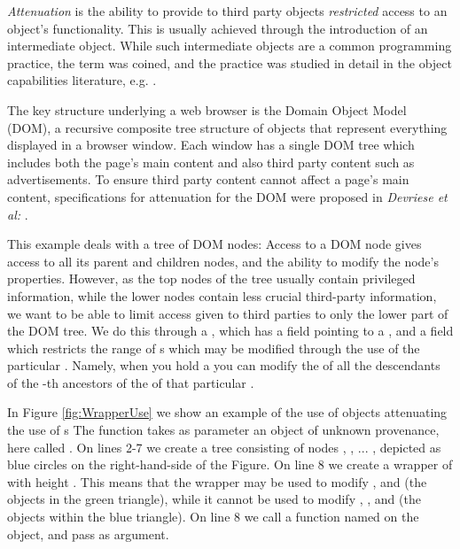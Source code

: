 \emph{Attenuation} is the ability to provide to third party objects \emph{restricted}  access to an object's functionality. This is usually achieved through the introduction of an intermediate object. While such intermediate objects are a common programming practice, 
the term was coined, and the practice  was studied in detail in the object capabilities literature,
e.g.  \cite{MillerPhD}. 

The key structure underlying a web browser is the Domain Object Model
(DOM), a recursive composite tree structure of objects that represent
everything displayed in a browser window.  Each window has a single DOM
tree which includes both the page's main content and also third party
content such as advertisements. To ensure third party content cannot
affect a page's main content,
specifications for attenuation for the DOM were proposed in
\textit{Devriese et al:}   \cite{dd}. 

This example deals with a tree of DOM nodes: Access to a DOM node
gives access to all its parent and children nodes, and the ability to
modify the node's properties. However, as the top nodes of the tree
usually contain privileged information, while the lower nodes contain
less crucial third-party information, we want to be able to limit  access given to third parties to only the lower part of the DOM tree. We do this through a , which has a field  pointing to a , and a field  which restricts the range of s which may be modified through the use of the particular . Namely, when you hold a   you can modify the  of all the descendants of the    -th ancestors of the  of that particular . %


In Figure \ref{fig:WrapperUse} we show an example of the use of   objects attenuating the use of s  The function  takes as parameter an object of unknown provenance, here called . On lines 2-7 we create  a tree consisting of nodes , , ... , depicted as blue circles on the   right-hand-side of the Figure. On line 8 we create a wrapper of  with height . This means that the wrapper  may be used to modify ,  and  (\ie the objects in the green triangle), while it cannot be used to modify , , and  (\ie the objects within the blue triangle). 
On line 8 we call a  function named  on the  object, and pass  as   argument. 


